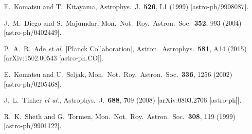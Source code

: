 \documentclass[aps,twocolumn,floats,prd,nofootinbib]{revtex4-1}
\begin{document}
\begin{thebibliography}{99}
  E.~Komatsu and T.~Kitayama,
  Astrophys.\ J.\  {\bf 526}, L1 (1999)
  [astro-ph/9908087].


  J.~M.~Diego and S.~Majumdar,
  Mon.\ Not.\ Roy.\ Astron.\ Soc.\  {\bf 352}, 993 (2004)
  [astro-ph/0402449].


  P.~A.~R.~Ade {\it et al.} [Planck Collaboration],
  Astron.\ Astrophys.\  {\bf 581}, A14 (2015)
  [arXiv:1502.00543 [astro-ph.CO]].


  E.~Komatsu and U.~Seljak,
  Mon.\ Not.\ Roy.\ Astron.\ Soc.\  {\bf 336}, 1256 (2002)
  [astro-ph/0205468].

  J.~L.~Tinker {\it et al.},
  Astrophys.\ J.\  {\bf 688}, 709 (2008)
  [arXiv:0803.2706 [astro-ph]].

  R.~K.~Sheth and G.~Tormen,
  Mon.\ Not.\ Roy.\ Astron.\ Soc.\  {\bf 308}, 119 (1999)
  [astro-ph/9901122].


\end{thebibliography}
\end{document}

